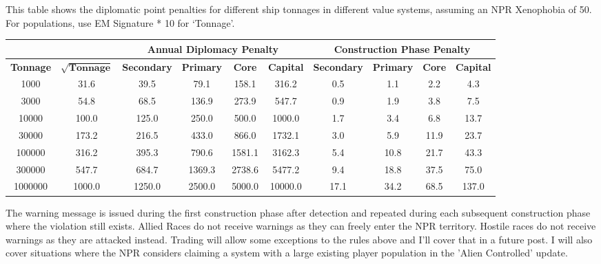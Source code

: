 \documentclass[../../Aurora C# unofficial manual.tex]{subfiles}
\begin{document}
	This table shows the diplomatic point penalties for different ship tonnages in different value systems, assuming an NPR Xenophobia of 50. For populations, use EM Signature * 10 for ‘Tonnage’.
	\begin{center}
		\begin{tabular}{|c|c|c|c|c|c|c|c|c|c|}
			\hline
			\multicolumn{2}{|c}{}  & \multicolumn{4}{|c|}{\textbf{Annual Diplomacy Penalty}} & \multicolumn{4}{c|}{\textbf{Construction Phase Penalty}}  \\
			\hline
			\textbf{Tonnage} & \( \sqrt{\textbf{Tonnage}} \) & \textbf{Secondary} & \textbf{Primary} & \textbf{Core} & \textbf{Capital} & \textbf{Secondary} & \textbf{Primary} & \textbf{Core} & \textbf{Capital} \\
			\hline
			1000 & 31.6 & 39.5 & 79.1 & 158.1 & 316.2 & 0.5 & 1.1 & 2.2 & 4.3 \\
			\hline
			3000 & 54.8 & 68.5 & 136.9 & 273.9 & 547.7 & 0.9 & 1.9 & 3.8 & 7.5 \\
			\hline
			10000 & 100.0 & 125.0 & 250.0 & 500.0 & 1000.0 & 1.7 & 3.4 & 6.8 & 13.7 \\
			\hline
			30000 & 173.2 & 216.5 & 433.0 & 866.0 & 1732.1 & 3.0 & 5.9 & 11.9 & 23.7 \\
			\hline
			100000 & 316.2 & 395.3 & 790.6 & 1581.1 & 3162.3 & 5.4 & 10.8 & 21.7 & 43.3 \\
			\hline
			300000 & 547.7 & 684.7 & 1369.3 & 2738.6 & 5477.2 & 9.4 & 18.8 & 37.5 & 75.0 \\
			\hline
			1000000 & 1000.0 & 1250.0 & 2500.0 & 5000.0 & 10000.0 & 17.1 & 34.2 & 68.5 & 137.0 \\
			\hline
		\end{tabular}
	\end{center}
	
	The warning message is issued during the first construction phase after detection and repeated during each subsequent construction phase where the violation still exists. Allied Races do not receive warnings as they can freely enter the NPR territory. Hostile races do not receive warnings as they are attacked instead. Trading will allow some exceptions to the rules above and I'll cover that in a future post. I will also cover situations where the NPR considers claiming a system with a large existing player population in the 'Alien Controlled' update.
\end{document}
